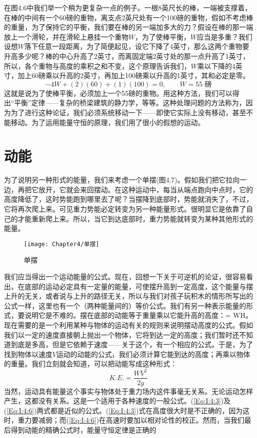 在图4.6中我们举一个稍为更复杂一点的例子。一根8英尺长的棒，一端被支撑着，在棒的中间有一个60磅的重物，离支点2英尺处有一个100磅的重物，假如不考虑棒的重量，为了保持它的平衡，我们要在棒的另一端加多大的力？假设在棒的那一端放上一个滑轮，并在滑轮上悬挂一个重物$ W $，为了使棒平衡，$ W $应当是多重？我们设想$ W $落下任意一段距离，为了简便起见，设它下降了4英寸，那么这两个重物要升高多少呢？棒的中心升高了2英寸，而离固定端2英寸处的那一点升高了1英寸，所以，各个重物与高度的乘积之和不变，这个原理告诉我们，$ W $乘以下降的4英寸，加上60磅乘以升高的2英寸，再加上100磅乘以升高的1英寸，其和必定是零。
\begin{equation}
    \label{Eq:I:4:5}
    -4W+(2)(60)+(1)(100)=0,\qquad
    W=\text{$55$ 磅}
\end{equation}
这就是说为了使棒平衡，必须加上一个55磅的重物。用这种方法，我们可以得出“平衡”定律——复杂的桥梁建筑的静力学，等等。这种处理问题的方法称为，因为为了进行这种论证，我们必须系统移动一下——即使它实际上没有移动，甚至不能移动。为了运用能量守恒的原理，我们用了很小的假想的运动。


\section{动能}

为了说明另一种形式的能量，我们来考虑一个单摆(图4.7)。假如我们把它拉向一边，再把它放开，它就会来回摆动。在这种运动中，每当从端点跑向中点时，它的高度降低了，这时势能跑到哪里去了呢？当摆降到底部时，势能就消失了，不过，它将再次爬上来。可见重力势能必定转变为另一种能量形式。很明显它是依靠了自己的才能重新爬上来。所以，当它到达底部时，重力势能就转变为某种其他形式的能量。

\begin{wrapfigure}{l}{0.4\textwidth}
    \centering
    \texttt{[image: Chapter4/单摆]}
    \caption{单摆}
    \label{figure:单摆}
\end{wrapfigure}

我们应当得出一个运动能量的公式。现在，回想一下关于可逆机的论证，很容易看出，在底部的运动必定具有一定量的能量，可使摆升高到一定高度，这个能量与摆上升的无关，或者说与上升的路径无关，所以与我们对孩子玩积木的情形所写出的公式一样，这里也有一个（两种能量间的）等价公式。我们有另一种表示能量的形式，要说明它是不难的。摆在底部的动能等于重量乘以它能升高的高度：= WH。现在需要的是一个利用某种与物体的运动有关的规则来说明摆动高度的公式。假如我们以一定的速度直接朝上抛出一个物体，它将到达一定的高度；我们暂时还不知道到底是多高，但是它依赖于速度——关于这个，有一个相应的公式。于是，为了找到物体以速度$ V $运动的动能的公式，我们必须计算它能到达的高度；再乘以物体的重量。我们立刻就会知道，可以把动能写成这种形式：
\begin{equation}
    \label{Eq:I:4:6}
    K.E.=\frac{WV^2}{2g}
\end{equation}
当然，运动具有能量这个事实与物体处于重力场内这件事毫无关系。无论运动怎样产生，这都没有关系。这是一个适用于各种速度的一般公式。(\ref{Eq:I:4:3})及(\ref{Eq:I:4:6})两式都是近似的公式。(\ref{Eq:I:4:3})式在高度很大时是不正确的，因为这时，重力要减弱；而(\ref{Eq:I:4:6})在高速时要加以相对论性的校正。然而，当我们最后得到动能的精确公式时，能量守恒定律是正确的


